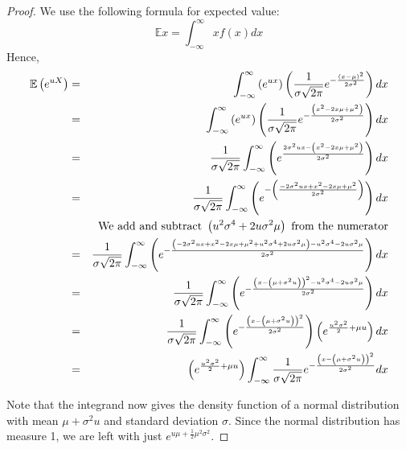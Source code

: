 \documentclass{article}
\newcommand{\E}{\mathbb{E}}
\theoremstyle{definition}
\theoremstyle{definition}
\begin{document}
\begin{enumerate}
\begin{enumerate}
        \begin{proof} We use the following formula for expected value:
        $$  \E x = \int_{-\infty}^\infty x f(x) dx $$
        Hence,
        \begin{eqnarray*}
\E\left( e^{uX}\right)  &=&\int_{-\infty }^{\infty }\left( e^{ux}\right)
\left( \frac{1}{\sigma \sqrt{2\pi }}e^{-\frac{\left( x-\mu \right) ^{2}}{
2\sigma ^{2}}}\right) dx \\
&=&\int_{-\infty }^{\infty }\left( e^{ux}\right) \left( \frac{1}{\sigma
\sqrt{2\pi }}e^{-\frac{\left( x^{2}-2x\mu +\mu ^{2}\right) }{2\sigma ^{2}}%
}\right) dx \\
&=&\frac{1}{\sigma \sqrt{2\pi }}\int_{-\infty }^{\infty }\left( e^{\frac{
2\sigma ^{2}ux-\left( x^{2}-2x\mu +\mu ^{2}\right) }{2\sigma ^{2}}}\right) dx
\\
&=&\frac{1}{\sigma \sqrt{2\pi }}\int_{-\infty }^{\infty }\left( e^{-\left(
\frac{-2\sigma ^{2}ux+x^{2}-2x\mu +\mu ^{2}}{2\sigma ^{2}}\right) }\right) dx
\\
&&\text{We add and subtract }\left( u^{2}\sigma ^{4}+2u\sigma ^{2}\mu
\right) \text{ from the numerator} \\
&=&\frac{1}{\sigma \sqrt{2\pi }}\int_{-\infty }^{\infty }\left( e^{-\frac{%
\left( -2\sigma ^{2}ux+x^{2}-2x\mu +\mu ^{2}+u^{2}\sigma ^{4}+2u\sigma
^{2}\mu \right) -u^{2}\sigma ^{4}-2u\sigma ^{2}\mu }{2\sigma ^{2}}}\right) dx \\
&=&\frac{1}{\sigma \sqrt{2\pi }}\int_{-\infty }^{\infty }\left( e^{-\frac{%
\left( x-\left( \mu +\sigma ^{2}u\right) \right) ^{2}-u^{2}\sigma
^{4}-2u\sigma ^{2}\mu }{2\sigma ^{2}}}\right) dx \\
&=&\frac{1}{\sigma \sqrt{2\pi }}\int_{-\infty }^{\infty }\left( e^{-\frac{
\left( x-\left( \mu +\sigma ^{2}u\right) \right) ^{2}}{2\sigma ^{2}}}\right)
\left( e^{\frac{u^{2}\sigma ^{2}}{2}+\mu u}\right) dx \\
&=&\left( e^{\frac{u^{2}\sigma ^{2}}{2}+\mu u}\right) \int_{-\infty
}^{\infty }\frac{1}{\sigma \sqrt{2\pi }}e^{-\frac{\left( x-\left( \mu+\sigma ^{2}u\right) \right) ^{2}}{2\sigma ^{2}}}dx
\end{eqnarray*}
        
        Note that the integrand now gives the density function of a normal distribution with mean $\mu+\sigma^2u$ and standard deviation $\sigma$. Since the normal distribution has measure 1, we are left with just $e^{u\mu+\frac{1}{2}\mu^2\sigma^2}$.
        \end{proof}
        

\end{enumerate}
\end{enumerate}
\end{document}
